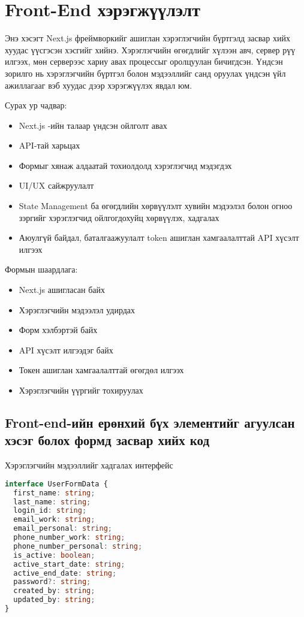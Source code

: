 \section{Front-End хэрэгжүүлэлт}
Энэ хэсэгт Next.js фреймворкийг ашиглан хэрэглэгчийн бүртгэлд засвар хийх хуудас үүсгэсэн хэсгийг хийнэ. Хэрэглэгчийн өгөгдлийг хүлээн авч, сервер рүү илгээх, мөн серверээс хариу авах процессыг оролцуулан бичигдсэн. Үндсэн зорилго нь хэрэглэгчийн бүртгэл болон мэдээллийг санд оруулах үндсэн үйл ажиллагааг вэб хуудас дээр хэрэгжүүлэх явдал юм.

Сурах ур чадвар:
\begin{itemize}
	\item Next.js -ийн талаар үндсэн ойлголт авах
	\item API-тай харьцах
	\item Формыг хянаж алдаатай тохиолдолд хэрэглэгчид мэдэгдэх
	\item UI/UX сайжруулалт
	\item State Management ба өгөгдлийн хөрвүүлэлт хувийн мэдээлэл болон огноо зэргийг хэрэглэгчид ойлгогдохуйц хөрвүүлэх, хадгалах
	\item Аюулгүй байдал, баталгаажуулалт token ашиглан хамгаалалттай API хүсэлт илгээх
\end{itemize}

Формын шаардлага:
\begin{itemize}
	\item Next.js ашигласан байх
	\item Хэрэглэгчийн мэдээлэл удирдах
	\item Форм хэлбэртэй байх
	\item API хүсэлт илгээдэг байх
	\item Токен ашиглан хамгаалалттай өгөгдөл илгээх
	\item Хэрэглэгчийн үүргийг тохируулах
\end{itemize}
\pagebreak

\subsection{Front-end-ийн ерөнхий бүх элементийг агуулсан хэсэг болох формд засвар хийх код}

Хэрэглэгчийн мэдээллийг хадгалах интерфейс

\begin{lstlisting}[language=Typescript, caption=UserFormData интерфейсийг үүсгэсэн байдал, frame=single]
interface UserFormData {
  first_name: string;
  last_name: string;
  login_id: string;
  email_work: string;
  email_personal: string;
  phone_number_work: string;
  phone_number_personal: string;
  is_active: boolean;
  active_start_date: string;
  active_end_date: string;
  password?: string;
  created_by: string;
  updated_by: string;
}
\end{lstlisting}

